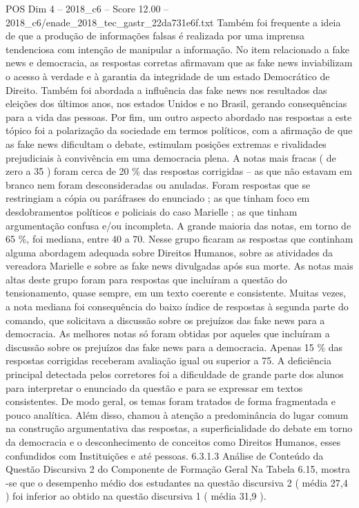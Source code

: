 \begin{textsample}{POS Dim 4 – 2018\_c6 – Score 12.00 – 2018\_c6/enade\_2018\_tec\_gastr\_22da731e6f.txt}
Também foi frequente a ideia de que a produção de informações falsas é realizada por uma imprensa tendenciosa com intenção de manipular a informação.
No item relacionado a fake news e democracia, as respostas corretas afirmavam que as fake news inviabilizam o acesso à verdade e à garantia da integridade de um estado Democrático de Direito.
Também foi abordada a influência das fake news nos resultados das eleições dos últimos anos, nos estados Unidos e no Brasil, gerando consequências para a vida das pessoas.
Por fim, um outro aspecto abordado nas respostas a este tópico foi a polarização da sociedade em termos políticos, com a afirmação de que as fake news dificultam o debate, estimulam posições extremas e rivalidades prejudiciais à convivência em uma democracia plena.
A notas mais fracas ( de zero a 35 ) foram cerca de 20 \% das respostas corrigidas – as que não estavam em branco nem foram desconsideradas ou anuladas.
Foram respostas que se restringiam a cópia ou paráfrases do enunciado ; as que tinham foco em desdobramentos políticos e policiais do caso Marielle ; as que tinham argumentação confusa e/ou incompleta.
A grande maioria das notas, em torno de 65 \%, foi mediana, entre 40 a 70.
Nesse grupo ficaram as respostas que continham alguma abordagem adequada sobre Direitos Humanos, sobre as atividades da vereadora Marielle e sobre as fake news divulgadas após sua morte.
As notas mais altas deste grupo foram para respostas que incluíram a questão do tensionamento, quase sempre, em um texto coerente e consistente.
Muitas vezes, a nota mediana foi consequência do baixo índice de respostas à segunda parte do comando, que solicitava a discussão sobre os prejuízos das fake news para a democracia.
As melhores notas só foram obtidas por aqueles que incluíram a discussão sobre os prejuízos das fake news para a democracia.
Apenas 15 \% das respostas corrigidas receberam avaliação igual ou superior a 75.
A deficiência principal detectada pelos corretores foi a dificuldade de grande parte dos alunos para interpretar o enunciado da questão e para se expressar em textos consistentes.
De modo geral, os temas foram tratados de forma fragmentada e pouco analítica.
Além disso, chamou à atenção a predominância do lugar comum na construção argumentativa das respostas, a superficialidade do debate em torno da democracia e o desconhecimento de conceitos como Direitos Humanos, esses confundidos com Instituições e até pessoas. 6.3.1.3 Análise de Conteúdo da Questão Discursiva 2 do Componente de Formação Geral Na Tabela 6.15, mostra -se que o desempenho médio dos estudantes na questão discursiva 2 ( média 27,4 ) foi inferior ao obtido na questão discursiva 1 ( média 31,9 ).

\end{textsample}
